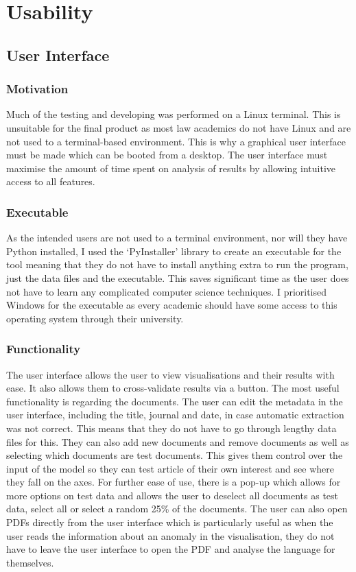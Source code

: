 	\section{Usability}
		\subsection{User Interface}\label{sec:uiimp}
			\subsubsection{Motivation}
				Much of the testing and developing was performed on a Linux terminal. This is unsuitable for the final product as most law academics do not have Linux and are not used to a terminal-based environment. This is why a graphical user interface must be made which can be booted from a desktop. The user interface must maximise the amount of time spent on analysis of results by allowing intuitive access to all features.
			\subsubsection{Executable}
				As the intended users are not used to a terminal environment, nor will they have Python installed, I used the `PyInstaller' library to create an executable for the tool meaning that they do not have to install anything extra to run the program, just the data files and the executable. This saves significant time as the user does not have to learn any complicated computer science techniques. I prioritised Windows for the executable as every academic should have some access to this operating system through their university.
			\subsubsection{Functionality}
				The user interface allows the user to view visualisations and their results with ease. It also allows them to cross-validate results via a button. The most useful functionality is regarding the documents. The user can edit the metadata in the user interface, including the title, journal and date, in case automatic extraction was not correct. This means that they do not have to go through lengthy data files for this. They can also add new documents and remove documents as well as selecting which documents are test documents. This gives them control over the input of the model so they can test article of their own interest and see where they fall on the axes. For further ease of use, there is a pop-up which allows for more options on test data and allows the user to deselect all documents as test data, select all or select a random 25\% of the documents. The user can also open PDFs directly from the user interface which is particularly useful as when the user reads the information about an anomaly in the visualisation, they do not have to leave the user interface to open the PDF and analyse the language for themselves.
				
